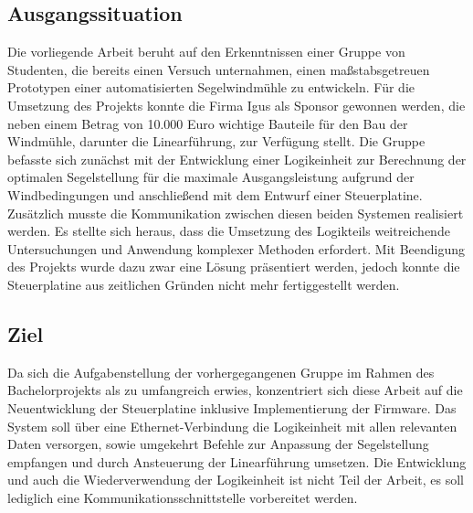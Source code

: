 \subsection{Ausgangssituation}
Die vorliegende Arbeit beruht auf den Erkenntnissen einer Gruppe von Studenten, die bereits einen Versuch unternahmen, einen maßstabsgetreuen Prototypen einer automatisierten Segelwindmühle zu entwickeln. Für die Umsetzung des Projekts konnte die Firma Igus als Sponsor gewonnen werden, die neben einem Betrag von 10.000 Euro wichtige Bauteile für den Bau der Windmühle, darunter die Linearführung, zur Verfügung stellt. Die Gruppe befasste sich zunächst mit der Entwicklung einer Logikeinheit zur Berechnung der optimalen Segelstellung für die maximale Ausgangsleistung aufgrund der Windbedingungen und anschließend mit dem Entwurf einer Steuerplatine. Zusätzlich musste die Kommunikation zwischen diesen beiden Systemen realisiert werden. Es stellte sich heraus, dass die Umsetzung des Logikteils weitreichende Untersuchungen und Anwendung komplexer Methoden erfordert. Mit Beendigung des Projekts wurde dazu zwar eine Lösung präsentiert werden, jedoch konnte die Steuerplatine aus zeitlichen Gründen nicht mehr fertiggestellt werden. 
\subsection{Ziel}
Da sich die Aufgabenstellung der vorhergegangenen Gruppe im Rahmen des Bachelorprojekts als zu umfangreich erwies, konzentriert sich diese Arbeit auf die Neuentwicklung der Steuerplatine inklusive Implementierung der Firmware. Das System soll über eine Ethernet-Verbindung die Logikeinheit mit allen relevanten Daten versorgen, sowie umgekehrt Befehle zur Anpassung der Segelstellung empfangen und durch Ansteuerung der Linearführung umsetzen. Die Entwicklung und auch die Wiederverwendung der Logikeinheit ist nicht Teil der Arbeit, es soll lediglich eine Kommunikationsschnittstelle vorbereitet werden.
\newpage




